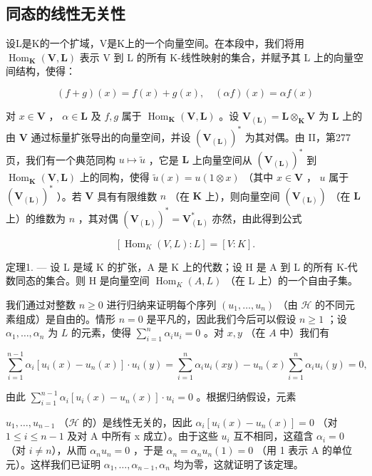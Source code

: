 \subsection{同态的线性无关性}

设L是K的一个扩域，V是K上的一个向量空间。在本段中，我们将用 \(\operatorname{Hom}_{\mathbf{K}}(\mathbf{V},\mathbf{L})\) 表示 V 到 L 的所有 K-线性映射的集合，并赋予其 L 上的向量空间结构，使得：

\[
(f + g) (x) = f (x) + g (x), \quad (\alpha f) (x) = \alpha f (x)\tag{1}
\]

对 \(x \in \mathbf{V}\) ， \(\alpha \in \mathbf{L}\) 及 \(f, g\) 属于 \(\operatorname{Hom}_{\mathbf{K}}(\mathbf{V}, \mathbf{L})\) 。设 \(\mathbf{V}_{(\mathbf{L})} = \mathbf{L} \otimes_{\mathbf{K}} \mathbf{V}\) 为 \(\mathbf{L}\) 上的由 \(\mathbf{V}\) 通过标量扩张导出的向量空间，并设 \((\mathbf{V}_{(\mathbf{L})})^*\) 为其对偶。由 II，第277页，我们有一个典范同构 \(u \mapsto \tilde{u}\) ，它是 \(\mathbf{L}\) 上向量空间从 \((\mathbf{V}_{(\mathbf{L})})^*\) 到 \(\operatorname{Hom}_{\mathbf{K}}(\mathbf{V}, \mathbf{L})\) 上的同构，使得 \(\tilde{u}(x) = u(1 \otimes x)\) （其中 \(x \in \mathbf{V}\) ， \(u\) 属于 \((\mathbf{V}_{(\mathbf{L})})^*\) ）。若 \(\mathbf{V}\) 具有有限维数 \(n\) （在 \(\mathbf{K}\) 上），则向量空间 \((\mathbf{V}_{(\mathbf{L})})\) （在 \(\mathbf{L}\) 上）的维数为 \(n\) ，其对偶 \((\mathbf{V}_{(\mathbf{L})})^* = \mathbf{V}_{(\mathbf{L})}^*\) 亦然，由此得到公式

\[
[ \operatorname{Hom} _ {K} (V, L): L ] = [ V: K ].\tag{2}
\]

定理1. --- 设 L 是域 K 的扩张，A 是 K 上的代数；设 H 是 A 到 L 的所有 K-代数同态的集合。则 H 是向量空间 \(\operatorname{Hom}_{K}(A, L)\) （在 L 上）的一个自由子集。

我们通过对整数 \(n \geqslant 0\) 进行归纳来证明每个序列 \((u_1, \ldots, u_n)\) （由 \(\mathcal{H}\) 的不同元素组成）是自由的。情形 \(n = 0\) 是平凡的，因此我们今后可以假设 \(n \geqslant 1\) ；设 \(\alpha_1, \ldots, \alpha_n\) 为 \(L\) 的元素，使得 \(\sum_{i=1}^{n} \alpha_i u_i = 0\) 。对 \(x, y\) （在 \(A\) 中）我们有

\[
\sum_ {i = 1} ^ {n - 1} \alpha_ {i} [ u _ {i} (x) - u _ {n} (x) ] \cdot u _ {i} (y) = \sum_ {i = 1} ^ {n} \alpha_ {i} u _ {i} (x y) - u _ {n} (x) \sum_ {i = 1} ^ {n} \alpha_ {i} u _ {i} (y) = 0,
\]

由此 \(\sum_{i=1}^{n-1} \alpha_i [u_i(x) - u_n(x)] \cdot u_i = 0\) 。根据归纳假设，元素

\(u_{1}, \ldots, u_{n-1}\) （\(\mathscr{H}\) 的）是线性无关的，因此 \(\alpha_{i}[u_{i}(x) - u_{n}(x)] = 0\) （对 \(1 \leqslant i \leqslant n-1\) 及对 A 中所有 x 成立）。由于这些 \(u_{i}\) 互不相同，这蕴含 \(\alpha_{i} = 0\) （对 \(i \neq n\)），从而 \(\alpha_{n}u_{n} = 0\) ，于是 \(\alpha_{n} = \alpha_{n}u_{n}(1) = 0\) （用 1 表示 A 的单位元）。这样我们已证明 \(\alpha_{1}, \ldots, \alpha_{n-1}, \alpha_{n}\) 均为零，这就证明了该定理。


